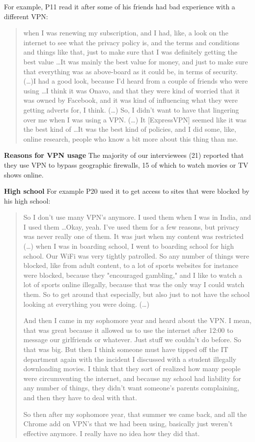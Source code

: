 For example, P11 read it after some of his friends had bad experience with a different VPN:
\begin{quote}when I was renewing my subscription, and I had, like, a look on the internet to see what the privacy policy is, and the terms and conditions and things like that, just to make sure that I was definitely getting the best value \dots It was mainly the best value for money, and just to make sure that everything was as above-board as it could be, in terms of security. (\dots)I had a good look, because I'd heard from a couple of friends who were using \dots I think it was Onavo, and that they were kind of worried that it was owned by Facebook, and it was kind of influencing what they were getting adverts for, I think. (\dots) So, I didn't want to have that lingering over me when I was using a VPN. (\dots) It [ExpressVPN] seemed like it was the best kind of \dots It was the best kind of policies, and I did some, like, online research, people who know a bit more about this thing than me.\end{quote}

\textbf{Reasons for VPN usage}
The majority of our interviewees (21) reported that they use VPN to bypass geographic firewalls, 15 of which to watch movies or TV shows online.  

\textbf{High school} For example P20 used it to get access to sites that were blocked by his high school: 
\begin{quote}So I don't use many VPN's anymore. I used them when I was in India, and I used them \dots Okay, yeah. I've used them for a few reasons, but privacy was never really one of them. It was just when my content was restricted (\dots) when I was in boarding school, I went to boarding school for high school. Our WiFi was very tightly patrolled. So any number of things were blocked, like from adult content, to a lot of sports websites for instance were blocked, because they "encouraged gambling," and I like to watch a lot of sports online illegally, because that was the only way I could watch them. So to get around that especially, but also just to not have the school looking at everything you were doing. (\dots) 

And then I came in my sophomore year and heard about the VPN. I mean, that was great because it allowed us to use the internet after 12:00 to message our girlfriends or whatever. Just stuff we couldn't do before. So that was big. But then I think someone must have tipped off the IT department again with the incident I discussed with a student illegally downloading movies. I think that they sort of realized how many people were circumventing the internet, and because my school had liability for any number of things, they didn't want someone's parents complaining, and then they have to deal with that.


So then after my sophomore year, that summer we came back, and all the Chrome add on VPN's that we had been using, basically just weren't effective anymore. I really have no idea how they did that.\end{quote}


